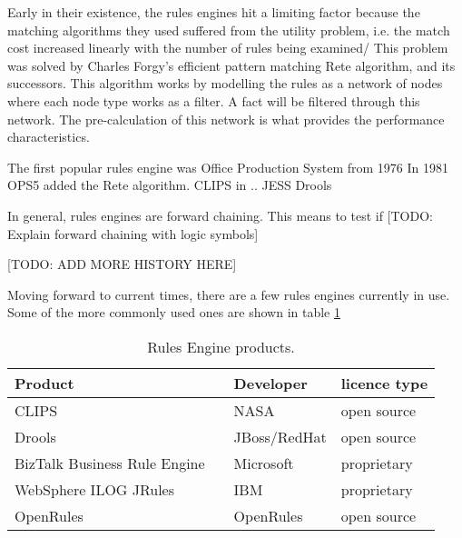 Early in their existence, the rules engines hit a limiting factor because the matching algorithms they used suffered from the utility problem, i.e. the match cost increased linearly with the number of rules being examined/
This problem was solved by Charles Forgy's efficient pattern matching Rete algorithm\cite{forgy1989rete}, and its successors.
This algorithm works by modelling the rules as a network of nodes where each node type works as a filter.
A fact will be filtered through this network.
The pre-calculation of this network is what provides the performance characteristics.

The first popular rules engine was Office Production System from 1976 
In 1981 OPS5 added the Rete algorithm.
CLIPS in  ..
JESS
Drools 



In general, rules engines are forward chaining.
This means to test if 
[TODO: Explain forward chaining with logic symbols] 

[TODO: ADD MORE HISTORY HERE]

Moving forward to current times, there are a few rules engines currently in use.
Some of the more commonly used ones are shown in table \ref{table:RuleEngines}

\begin{table}
    \begin{center}
        \begin{tabular}{ |l c |l|l| } 
            \hline
            Product                      &                             & Developer    & licence type   \\
            \hline
            CLIPS                        & \cite{CLIPSProductPage}     & NASA         & open source    \\ 
            Drools                       & \cite{DroolsProductPage}    & JBoss/RedHat & open source    \\ 
            BizTalk Business Rule Engine & \cite{BiztalkProductPage}   & Microsoft    & proprietary    \\ 
            WebSphere ILOG JRules        & \cite{JRulesProductPage}    & IBM          & proprietary    \\ 
            OpenRules                    & \cite{OpenRulesProductPage} & OpenRules    & open source    \\ 
            \hline
        \end{tabular}
    \end{center}
    \caption{Rules Engine products.}
    \label{table:RuleEngines}
\end{table}

